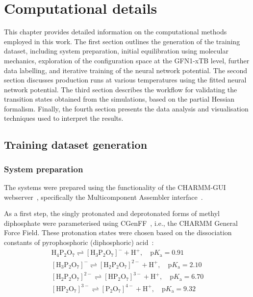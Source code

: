 \chapter{Computational details}
This chapter provides detailed information on the computational methods employed in this work. The first section outlines the generation of the training dataset, including system preparation, initial equilibration using molecular mechanics, exploration of the configuration space at the GFN1-xTB level, further data labelling, and iterative training of the neural network potential. The second section discusses production runs at various temperatures using the fitted neural network potential. The third section describes the workflow for validating the transition states obtained from the simulations, based on the partial Hessian formalism. Finally, the fourth section presents the data analysis and visualisation techniques used to interpret the results.


\section{Training dataset generation}

\subsection{System preparation}
The systems were prepared using the functionality of the CHARMM-GUI webserver~\citep{joCHARMMGUIWebbasedGraphical2008}, specifically the Multicomponent Assembler interface~\citep{kernCHARMMGUIMulticomponentAssembler2024}.

As a first step, the singly protonated and deprotonated forms of methyl diphosphate were parameterised using CGenFF~\citep{kimCHARMMGUILigandReader2017}, i.e., the CHARMM General Force Field. These protonation states were chosen based on the dissociation constants of pyrophosphoric (diphosphoric) acid~\citep{haynesCRCHandbookChemistry2016}:
\begin{align*}
    \mathrm{H_4P_2O_7} \rightleftharpoons \mathrm{[H_3P_2O_7]^-} + \mathrm{H^+},\quad \mathrm{p}K_\mathrm{a} = 0.91 \\
    \mathrm{[H_3P_2O_7]^-} \rightleftharpoons \mathrm{[H_2P_2O_7]^{2-}} + \mathrm{H^+},\quad \mathrm{p}K_\mathrm{a} = 2.10 \\
    \mathrm{[H_2P_2O_7]^{2-}} \rightleftharpoons \mathrm{[HP_2O_7]^{3-}} + \mathrm{H^+},\quad \mathrm{p}K_\mathrm{a} = 6.70 \\
    \mathrm{[HP_2O_7]^{3-}} \rightleftharpoons \mathrm{[P_2O_7]^{4-}} + \mathrm{H^+},\quad \mathrm{p}K_\mathrm{a} = 9.32
\end{align*}

